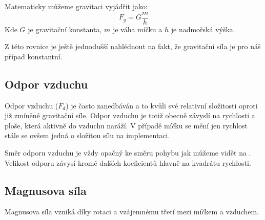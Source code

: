 Matematicky můžeme gravitaci vyjádřit jako:
\[
 F_g = G\frac{m}{h}
\]
Kde $G$ je gravitační konstanta, $m$ je váha míčku a $h$ je nadmořská výška.

Z této rovnice je ještě jednodušší nahlédnout na fakt, že gravitační síla je pro
náš případ konstantní. 


\subsection{Odpor vzduchu}
\label{ssec:odpor-vzduchu}

Odpor vzduchu ($F_d$) je často zanedbáván a to kvůli své relativní složitosti
oproti již zmíněné gravitační síle. Odpor vzduchu je totiž obecně závyslí na
rychlosti a ploše, která aktivně do vzduchu naráží. V případě míčku se mění jen
rychlost stále se ovšem jedná o složitou sílu na implementaci.

Směr odporu vzduchu je vždy opačný ke směru pohybu jak můžeme vidět na
. Velikost odporu závysí
kromě dalších koeficientů hlavně na kvadrátu rychlosti. 


\subsection{Magnusova síla}
\label{ssec:magnusova-sila}

Magnusova síla vzniká díky rotaci a vzájemnému třetí mezi míčkem a vzduchem.

